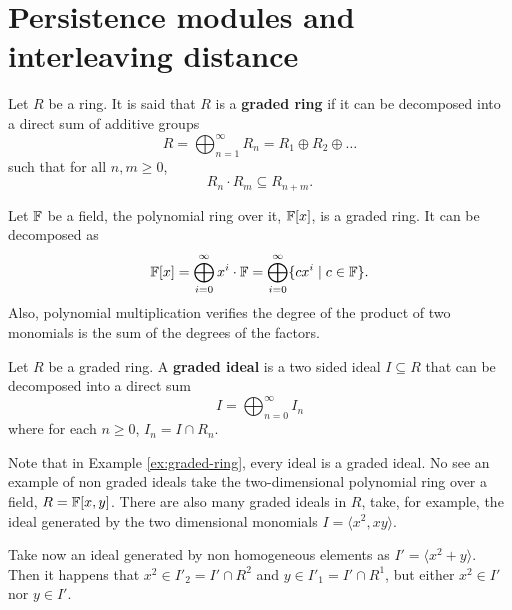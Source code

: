 \section{Persistence modules and interleaving distance} \label{sec:preliminaries-persistence-modules}

\begin{definition}
    Let $ R $ be a ring. It is said that $ R $ is a {\bf graded ring} if it can be decomposed into a direct sum of additive groups
    \begin{equation}
        R = \bigoplus_{n=1}^{\infty} R_n = R_1 \oplus R_2 \oplus \dots
    \end{equation}
    such that for all $ n, m \geq 0 $, 
    \begin{equation}
        R_n \cdot R_m \subseteq R_{n+m}.
    \end{equation}
\end{definition}

\begin{example} \label{ex:graded-ring}
    Let $ \mathbb F $ be a field, the polynomial ring over it, $ \mathbb F[x] $, is a graded ring. It can be decomposed as
    \begin{equation}
        \mathbb F[x] = \bigoplus_{i=0}^\infty x^i \cdot \mathbb F = \bigoplus_{i=0}^\infty \{c x^i \mid c \in \mathbb F\}.
    \end{equation}
    Also, polynomial multiplication verifies the degree of the product of two monomials is the sum of the degrees of the factors.
\end{example}

\begin{definition}
    Let $ R $ be a graded ring. A {\bf graded ideal} is a two sided ideal $ I \subseteq R $ that can be decomposed into a direct sum
    \begin{equation}
        I = \bigoplus_{n=0}^{\infty} I_n
    \end{equation}
    where for each $n \geq 0 $, $ I_n = I \cap R_n $.
\end{definition}

\begin{example}
    Note that in Example \ref{ex:graded-ring}, every ideal is a graded ideal. No see an example of non graded ideals take the two-dimensional polynomial ring over a field, $ R = \mathbb F[x, y] $. There are also many graded ideals in $ R $, take, for example, the ideal generated by the two dimensional monomials $ I = \langle x^2, xy \rangle $.

    Take now an ideal generated by non homogeneous elements as $ I' = \langle x^2 + y \rangle $. Then it happens that $ x^2 \in I'_2 = I' \cap R^2 $ and $ y \in I'_1 = I' \cap R^1 $, but either $ x^2 \in I' $ nor $ y \in I' $.
\end{example}

